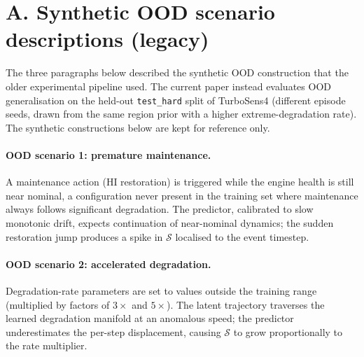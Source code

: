 %
%
%

\section*{A. Synthetic OOD scenario descriptions (legacy)}

The three paragraphs below described the synthetic OOD construction that the
older experimental pipeline used. The current paper instead evaluates OOD
generalisation on the held-out \texttt{test\_hard} split of TurboSens4
(different episode seeds, drawn from the same region prior with a higher
extreme-degradation rate). The synthetic constructions below are kept for
reference only.

\paragraph{OOD scenario 1: premature maintenance.}
A maintenance action (HI restoration) is triggered while the engine health
is still near nominal, a configuration never present in the training set
where maintenance always follows significant degradation.
The predictor, calibrated to slow monotonic drift, expects continuation of
near-nominal dynamics; the sudden restoration jump produces a spike in
$\mathcal{S}$ localised to the event timestep.

\paragraph{OOD scenario 2: accelerated degradation.}
Degradation-rate parameters are set to values outside the training range
(multiplied by factors of $3\times$ and $5\times$).
The latent trajectory traverses the learned degradation manifold at an
anomalous speed; the predictor underestimates the per-step displacement,
causing $\mathcal{S}$ to grow proportionally to the rate multiplier.

